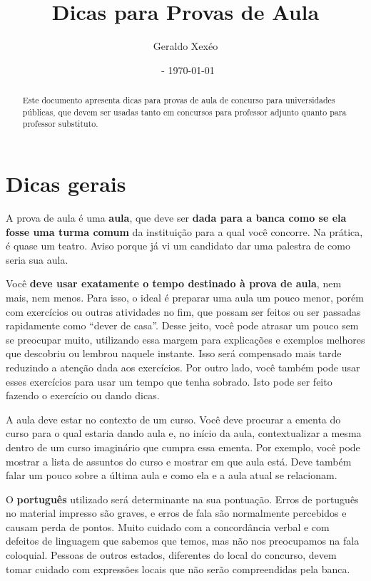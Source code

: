 \documentclass{article}
\title{Dicas para Provas de Aula}
\author{Geraldo Xexéo}
\affil{\url{xexeo@ufrj.br} \\
\url{http://xexeo.net}}
\date{\ccbyncsa\  - \today}
\begin{document}
\maketitle

\begin{abstract}
    Este documento apresenta dicas para provas de aula de concurso para universidades públicas, que devem ser usadas tanto em concursos para professor adjunto quanto para professor substituto.
\end{abstract}




\section{Dicas gerais}



A prova de aula é uma \textbf{aula}, que deve ser \textbf{dada para a banca como se ela fosse uma turma comum} da instituição para a qual você concorre. Na prática, é quase um teatro. Aviso porque já vi um candidato dar uma palestra de como seria sua aula.

Você \textbf{deve usar exatamente o tempo destinado à prova de aula}, nem mais, nem menos. Para isso, o ideal é preparar uma aula um pouco menor, porém com exercícios ou outras atividades no fim, que possam ser feitos ou ser passadas rapidamente como ``dever de casa''. 
Desse jeito, você pode atrasar um pouco sem se preocupar muito, utilizando essa margem para explicações e exemplos melhores que descobriu ou lembrou naquele instante. Isso será compensado mais tarde reduzindo a atenção dada aos exercícios.
Por outro lado, você também pode usar esses exercícios para usar um tempo que tenha sobrado. Isto pode ser feito fazendo o exercício ou dando dicas.

A aula deve estar no contexto de um curso. Você deve procurar a ementa do curso para o qual estaria dando aula e, no início da aula, contextualizar a mesma dentro de um curso imaginário que cumpra essa ementa. Por exemplo, você pode mostrar a lista de assuntos do curso e mostrar em que aula está. Deve também falar um pouco sobre a última aula e como ela e a aula atual se relacionam.

O \textbf{português} utilizado será determinante na sua pontuação. Erros de português no material impresso são graves, e erros de fala são normalmente percebidos e causam perda de pontos. Muito cuidado com a concordância verbal e com defeitos de linguagem que sabemos que temos, mas não nos preocupamos na fala coloquial. Pessoas de outros estados, diferentes do local do concurso, devem tomar cuidado com expressões locais que não serão compreendidas pela banca.
\end{document}
